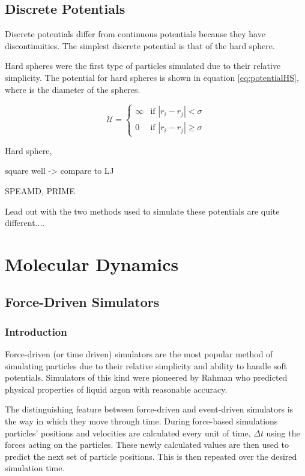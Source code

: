 \message{ !name(main.tex)}\documentclass[12pt]{UoAthesis}
\begin{document}
\section{Discrete Potentials}

Discrete potentials differ from continuous potentials because they
have discontinuities.  The simplest discrete potential is that of the
hard sphere.

Hard spheres were the first type of particles simulated
\cite{Alder1957} due to their relative simplicity.  The potential for
hard spheres is shown in equation \eqref{eq:potentialHS}, where \sigma
is the diameter of the spheres.

\begin{equation}
  \label{eq:potentialHS}
  \mathcal{U} = 
  \begin{cases}
    \infty &\text{if } |r_i - r_j| < \sigma \\
    0 &\text{if } |r_i - r_j| \geq \sigma
  \end{cases}
\end{equation}



Hard sphere,

square well -> compare to LJ

SPEAMD, PRIME

Lead out with the two methods used to simulate these potentials are quite different....

\chapter{Molecular Dynamics}
\section{Force-Driven Simulators}
\subsection{Introduction} 
Force-driven (or time driven) simulators are the most popular method
of simulating particles due to their relative simplicity and ability
to handle soft potentials. Simulators of this kind were pioneered by
Rahman \cite{Rahman1964} who predicted physical properties of liquid
argon with reasonable accuracy.

The distinguishing feature between force-driven and event-driven
simulators is the way in which they move through time. During
force-based simulations particles' positions and velocities are
calculated every unit of time, $\Delta t$ using the forces acting on
the particles. These newly calculated values are then used to predict
the next set of particle positions. This is then repeated over the
desired simulation time.
\end{document}
